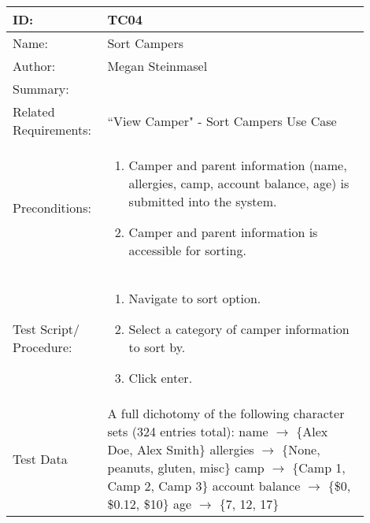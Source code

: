 \documentclass[11pt]{article}
\begin{document}
\begin{table}[H]
\begin{center}
\begin{tabular}{p{0.20\linewidth}p{0.70\linewidth}}
	ID: & TC04\\\hline
	Name: & Sort Campers \\\hline
	Author: & Megan Steinmasel\\\hline
	Summary: &  \\\hline
	Related \hspace{5em} Requirements:& ``View Camper" - Sort Campers Use Case\\\hline
	Preconditions:& \begin{enumerate}[topsep=0pt] 
		\item Camper and parent information (name, allergies, camp, account balance, age) is submitted into the system.
		\item Camper and parent information is accessible for sorting.
	\end{enumerate}\\\hline
	Test Script/ Procedure: & \begin{enumerate}[topsep=0pt]
	\item Navigate to sort option.
	\item Select a category of camper information to sort by.
	\item Click enter.
	\end{enumerate}\\\hline
	Test Data & \vspace*{.25em} A full dichotomy of the following character sets (324 entries total): \newline
	\hspace*{1cm} name $\rightarrow$ $\{$Alex Doe, Alex Smith$\}$	\newline
	\hspace*{1cm} allergies $\rightarrow$ $\{$None, peanuts, gluten, misc$\}$	\newline
	\hspace*{1cm} camp $\rightarrow$ $\{$Camp 1, Camp 2, Camp 3$\}$\newline
	\hspace*{1cm} account balance $\rightarrow$ $\{$\$0, \$0.12, \$10$\}$\newline
	\hspace*{1cm} age $\rightarrow$ $\{$7, 12, 17$\}$
\end{tabular}
\label{des:}	
\end{center}
\end{table}
\end{document}
